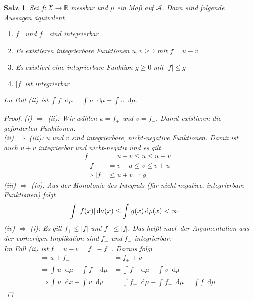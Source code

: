 \documentclass[11pt, twoside, a4paper]{article}
\theoremstyle{plain}
\newtheorem{satz}[blockelement]{Satz}
\numberwithin{equation}{subsection}
\newcommand{\of}[1]{\mathopen{}\mathclose{}\bgroup\left(#1\aftergroup\egroup\right)}
\newcommand{\abs}[1]{\left\lvert#1\right\rvert}
\newcommand{\impl}[0]{\Rightarrow{}}
\newcommand{\dif}{\mathop{}\!\mathrm{d}}
\newcommand{\dsty}{\displaystyle}
\newcommand{\R}{\mathbb{R}}
\newcommand{\mA}{\mathcal{A}}
\begin{document}
    \begin{satz}
        \label{satz:integrierbarkeit-equi}
        Sei $f: X \to\overline{\R}$ messbar und $\mu$ ein Maß auf $\mA$. Dann sind folgende Aussagen äquivalent
        \begin{enumerate}[label=(\roman*)]
            \item $f_+$ und $f_-$ sind integrierbar
            \item Es existieren integrierbare Funktionen $u, v\geq 0$ mit $f = u-v$
            \item Es existiert eine integrierbare Funktion $g\geq 0$ mit $\abs{f} \leq g$
            \item $\abs{f}$ ist integrierbar
        \end{enumerate}
        Im Fall (ii) ist $\dsty \int_{}^{} f \dif \mu = \int_{}^{} u \dif \mu - \int_{}^{} v \dif \mu$.
        \marginnote{[10. Jan]}
        \begin{proof}
        (i)
            $\impl$ (ii): Wir wählen $u= f_+$ und $v=f_-$. Damit existieren die geforderten Funktionen.\\[.2\baselineskip]
            (ii) $\impl$ (iii): $u$ und $v$ sind integrierbare, nicht-negative Funktionen. Damit ist auch $u+v$ integrierbar und nicht-negativ und es gilt
            \begin{align*}
                f &= u-v \leq u \leq u+v\\
                -f &= v -u \leq v \leq v+u\\
                \impl \abs{f} &\leq u + v \eqqcolon g
            \end{align*}
            (iii) $\impl$ (iv): Aus der Monotonie des Integrals (für nicht-negative, integrierbare Funktionen) folgt
            \begin{align*}
                \int_{}^{} \abs{f\of{x}} \dif \mu\of{x} &\leq \int_{}^{} g\of{x} \dif \mu\of{x} < \infty
            \end{align*}
            (iv) $\impl$ (i): Es gilt $f_+ \leq \abs{f}$ und $f_- \leq \abs{f}$. Das heißt nach der Argumentation aus der vorherigen Implikation sind $f_+$ und $f_-$ integrierbar.\\[.5\baselineskip]
            Im Fall (ii) ist $f = u-v = f_+ - f_-$. Daraus folgt
            \begin{align*}
                \impl u + f_- &= f_+ + v\\
                \impl \int_{}^{} u \dif \mu + \int_{}^{} f_- \dif \mu &= \int_{}^{} f_+ \dif \mu + \int_{}^{} v \dif \mu\\
                \impl \int_{}^{} u \dif x - \int_{}^{} v \dif \mu &= \int_{}^{} f_+ \dif \mu - \int_{}^{} f_- \dif \mu = \int_{}^{} f \dif \mu
            \end{align*}
        \end{proof}
    \end{satz}
\end{document}
